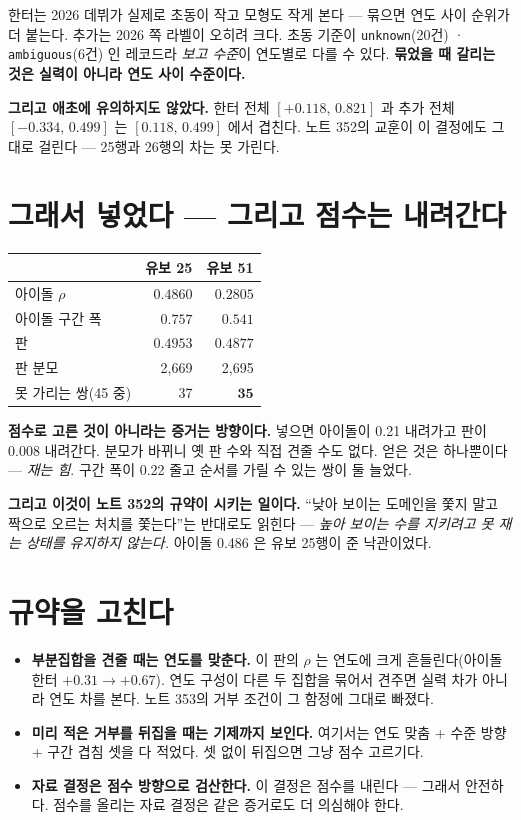 \documentclass[11pt]{article}
\begin{document}
한터는 2026 데뷔가 실제로 초동이 작고 모형도 작게 본다 --- 묶으면 연도
사이 순위가 더 붙는다. 추가는 2026 쪽 라벨이 오히려 크다. 초동 기준이
\texttt{unknown}(20건) · \texttt{ambiguous}(6건) 인 레코드라 \emph{보고
수준}이 연도별로 다를 수 있다. \textbf{묶었을 때 갈리는 것은 실력이 아니라
연도 사이 수준이다.}

\textbf{그리고 애초에 유의하지도 않았다.} 한터 전체 $[+0.118,\,0.821]$ 과
추가 전체 $[-0.334,\,0.499]$ 는 $[0.118,\,0.499]$ 에서 겹친다. 노트 352의
교훈이 이 결정에도 그대로 걸린다 --- 25행과 26행의 차는 못 가린다.

\section{그래서 넣었다 --- 그리고 점수는 내려간다}

\begin{center}
\begin{tabular}{lrr}
\hline
 & 유보 25 & 유보 51 \\
\hline
아이돌 $\rho$      & $0.4860$ & $\mathbf{0.2805}$ \\
아이돌 구간 폭     & $0.757$  & $\mathbf{0.541}$ \\
판                 & $0.4953$ & $\mathbf{0.4877}$ \\
판 분모            & 2,669    & 2,695 \\
못 가리는 쌍(45 중)& 37       & $\mathbf{35}$ \\
\hline
\end{tabular}
\end{center}

\textbf{점수로 고른 것이 아니라는 증거는 방향이다.} 넣으면 아이돌이
0.21 내려가고 판이 0.008 내려간다. 분모가 바뀌니 옛 판 수와 직접 견줄
수도 없다. 얻은 것은 하나뿐이다 --- \emph{재는 힘}. 구간 폭이 0.22 줄고
순서를 가릴 수 있는 쌍이 둘 늘었다.

\textbf{그리고 이것이 노트 352의 규약이 시키는 일이다.} ``낮아 보이는
도메인을 쫓지 말고 짝으로 오르는 처치를 쫓는다''는 반대로도 읽힌다 ---
\emph{높아 보이는 수를 지키려고 못 재는 상태를 유지하지 않는다.} 아이돌
0.486 은 유보 25행이 준 낙관이었다.

\section{규약을 고친다}

\begin{itemize}
\item \textbf{부분집합을 견줄 때는 연도를 맞춘다.} 이 판의 $\rho$ 는
연도에 크게 흔들린다(아이돌 한터 $+0.31 \to +0.67$). 연도 구성이 다른
두 집합을 묶어서 견주면 실력 차가 아니라 연도 차를 본다. 노트 353의
거부 조건이 그 함정에 그대로 빠졌다.
\item \textbf{미리 적은 거부를 뒤집을 때는 기제까지 보인다.} 여기서는
연도 맞춤 + 수준 방향 + 구간 겹침 셋을 다 적었다. 셋 없이 뒤집으면
그냥 점수 고르기다.
\item \textbf{자료 결정은 점수 방향으로 검산한다.} 이 결정은 점수를
내린다 --- 그래서 안전하다. 점수를 올리는 자료 결정은 같은 증거로도
더 의심해야 한다.
\end{itemize}
\end{document}
